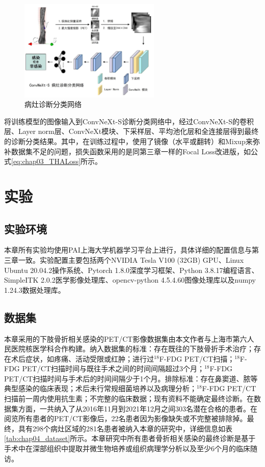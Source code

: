 \begin{figure}[htbp]
  \centering
  \includegraphics[width=0.6\textwidth]{figures/chap04_classifier.jpg}
  \caption{病灶诊断分类网络}
  \label{fig:chap04_classifier}
\end{figure}

将训练模型的图像输入到ConvNeXt-S诊断分类网络中，经过ConvNeXt-S的卷积层、Layer norm层、ConvNeXt模块、下采样层、平均池化层和全连接层得到最终的诊断分类结果。其中，在训练过程中，使用了镜像（水平或翻转）和Mixup来弥补数据集不足的问题，损失函数采用的是同第三章一样的Focal Loss改进版，如公式\ref{eq:chap03_THALoss}所示。

\section{实验}

\subsection{实验环境}

本章所有实验均使用PAI上海大学机器学习平台上进行，具体详细的配置信息与第三章一致。实验配置主要包括两个NVIDIA Tesla V100 (32GB) GPU、Linux Ubuntu 20.04.2操作系统、Pytorch 1.8.0深度学习框架、Python 3.8.17编程语言、SimpleITK 2.0.2医学影像处理库、opencv-python 4.5.4.60图像处理库以及numpy 1.24.3数据处理库。

\subsection{数据集}

本章采用的下肢骨折相关感染的PET/CT影像数据集由本文作者与上海市第六人民医院核医学科合作构建。纳入数据集的标准：存在既往的下肢骨折手术治疗；存在术后症状，如疼痛、活动受限或红肿；进行过\(^{18}\)F-FDG PET/CT扫描；\(^{18}\)F-FDG PET/CT扫描时间与既往手术之间的时间间隔超过3个月；\(^{18}\)F-FDG PET/CT扫描时间与手术后的时间间隔少于1个月。排除标准：存在鼻窦道、脓等典型感染的临床表现；术后未行常规细菌培养以及病理分析；\(^{18}\)F-FDG PET/CT扫描前一周内使用抗生素；不完整的临床数据；现有资料不能确定最终诊断。在数据集方面，一共纳入了从2016年11月到2021年12月之间303名潜在合格的患者。在阅览所有患者的PET/CT影像后，22名患者因为影像缺失或不完整被排除掉。最终，具有298个病灶区域的281名患者被纳入本章的研究中，详细信息如表\ref{tab:chap04_dataset}所示。本章研究中所有患者骨折相关感染的最终诊断是基于手术中在深部组织中提取并微生物培养或组织病理学分析以及至少6个月的临床随访。

